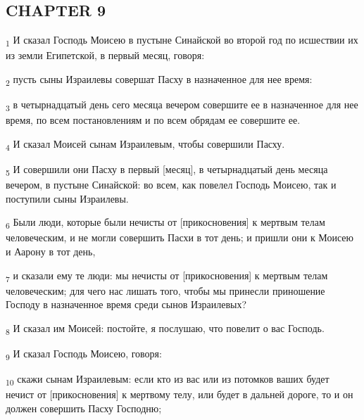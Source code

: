 \subsection{CHAPTER 9}
\begin{tcolorbox}
\textsubscript{1} И сказал Господь Моисею в пустыне Синайской во второй год по исшествии их из земли Египетской, в первый месяц, говоря:
\end{tcolorbox}
\begin{tcolorbox}
\textsubscript{2} пусть сыны Израилевы совершат Пасху в назначенное для нее время:
\end{tcolorbox}
\begin{tcolorbox}
\textsubscript{3} в четырнадцатый день сего месяца вечером совершите ее в назначенное для нее время, по всем постановлениям и по всем обрядам ее совершите ее.
\end{tcolorbox}
\begin{tcolorbox}
\textsubscript{4} И сказал Моисей сынам Израилевым, чтобы совершили Пасху.
\end{tcolorbox}
\begin{tcolorbox}
\textsubscript{5} И совершили они Пасху в первый [месяц], в четырнадцатый день месяца вечером, в пустыне Синайской: во всем, как повелел Господь Моисею, так и поступили сыны Израилевы.
\end{tcolorbox}
\begin{tcolorbox}
\textsubscript{6} Были люди, которые были нечисты от [прикосновения] к мертвым телам человеческим, и не могли совершить Пасхи в тот день; и пришли они к Моисею и Аарону в тот день,
\end{tcolorbox}
\begin{tcolorbox}
\textsubscript{7} и сказали ему те люди: мы нечисты от [прикосновения] к мертвым телам человеческим; для чего нас лишать того, чтобы мы принесли приношение Господу в назначенное время среди сынов Израилевых?
\end{tcolorbox}
\begin{tcolorbox}
\textsubscript{8} И сказал им Моисей: постойте, я послушаю, что повелит о вас Господь.
\end{tcolorbox}
\begin{tcolorbox}
\textsubscript{9} И сказал Господь Моисею, говоря:
\end{tcolorbox}
\begin{tcolorbox}
\textsubscript{10} скажи сынам Израилевым: если кто из вас или из потомков ваших будет нечист от [прикосновения] к мертвому телу, или будет в дальней дороге, то и он должен совершить Пасху Господню;
\end{tcolorbox}
